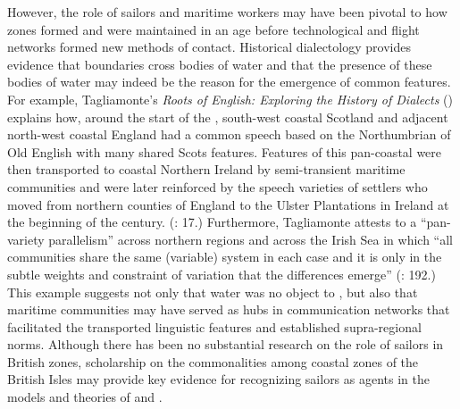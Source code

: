 However, the role of sailors and maritime workers may have been pivotal to how  zones formed and were maintained in an age before technological and flight networks formed new methods of contact. Historical dialectology provides evidence that  boundaries cross bodies of water and that the presence of these bodies of water may indeed be the reason for the emergence of common features. For example, Tagliamonte’s \textit{Roots of English: Exploring the History of Dialects} (\citeyear*{Tagliamonte2013}) explains how, around the start of the , south-west coastal Scotland and adjacent north-west coastal England had a common speech based on the Northumbrian  of Old English with many shared Scots features. Features of this pan-coastal  were then transported to coastal Northern Ireland by semi-transient maritime communities and were later reinforced by the speech varieties of settlers who moved from northern counties of England to the Ulster Plantations in Ireland at the beginning of the century. (\citealt{Tagliamonte2013}: 17.) Furthermore, Tagliamonte attests to a “pan-variety parallelism” across northern regions and across the Irish Sea in which “all communities share the same (variable) system in each case and it is only in the subtle weights and constraint of variation that the differences emerge” (\citeyear*{Tagliamonte2013}: 192.) This example suggests not only that water was no object to , but also that maritime communities may have served as hubs in communication networks that facilitated the transported linguistic features and established supra-regional norms. Although there has been no substantial research on the role of sailors in British  zones, scholarship on the commonalities among coastal zones of the British Isles may provide key evidence for recognizing sailors as agents in the models and theories of  and . 

